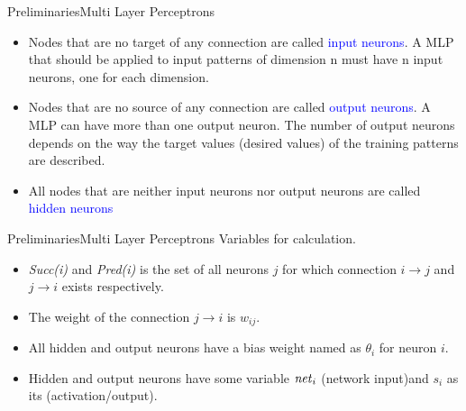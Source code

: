 \documentclass{beamer}
\begin{document}
\begin{frame}{Preliminaries}{Multi Layer Perceptrons}
\begin{itemize}
\item Nodes that are no target of any connection are called \textcolor{blue}{input neurons}. A MLP that should be applied to input patterns of dimension n must have n input neurons, one for each dimension. 
\item Nodes that are no source of any connection are called \textcolor{blue}{output neurons}. A
MLP can have more than one output neuron. The number of output neurons depends on the way the target values (desired values) of the training patterns are described. 
\item All nodes that are neither input neurons nor output neurons are called \textcolor{blue}{hidden neurons}

\end{itemize}
\end{frame}	

\begin{frame}{Preliminaries}{Multi Layer Perceptrons}
Variables for calculation. 
\vspace{5mm}
\begin{itemize}
\item \textit{Succ(i)} and \textit{Pred(i)} is the set of all neurons $ j $ for which connection $ i \rightarrow j $ and $ j \rightarrow i $ exists respectively.  
\item The weight of the connection $ j \rightarrow i $ is $ w_{ij} $. 
\item All hidden and output neurons have a bias weight named as $ \theta_i $ for neuron $ i $.  
\item Hidden and output neurons have some variable $ \text{\textit{net}}_{i} $  (network input)and $ s_i $ as its (activation/output). 
\end{itemize}	

\end{frame}	
\end{document}
